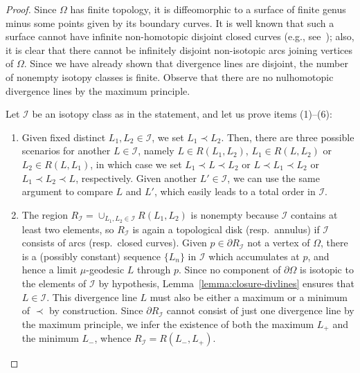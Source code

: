 \documentclass[a4paper,10pt,reqno]{amsart}
\theoremstyle{definition}
\theoremstyle{remark}
\numberwithin{equation}{section}
\begin{document}
\begin{proof}
Since $\Omega$ has finite topology, it is diffeomorphic to a surface of finite genus minus some points given by its boundary curves. It is well known that such a surface cannot have infinite non-homotopic disjoint closed curves (e.g., see~\cite[Prop.~2.3.3]{Arettines}); also, it is clear that there cannot be infinitely disjoint non-isotopic arcs joining vertices of $\Omega$. Since we have already shown that divergence lines are disjoint, the number of nonempty isotopy classes is finite. Observe that there are no nulhomotopic divergence lines by the maximum principle. 

Let $\mathcal I$ be an isotopy class as in the statement, and let us prove items (1)--(6):
\begin{enumerate}[label=(\arabic*)]
	\item Given fixed distinct $L_1,L_2\in\mathcal I$, we set $L_1\prec L_2$. Then, there are three possible scenarios for another $L\in\mathcal I$, namely $L\in R(L_1,L_2)$, $L_1\in R(L,L_2)$ or $L_2\in R(L,L_1)$, in which case we set $L_1\prec L\prec L_2$ or $L\prec L_1\prec L_2$ or $L_1\prec L_2\prec L$, respectively. Given another $L'\in\mathcal I$, we can use the same argument to compare $L$ and $L'$, which easily leads to a total order in $\mathcal I$.
	\item The region $R_{\mathcal I}=\cup_{L_1,L_2\in\mathcal I}R(L_1,L_2)$ is nonempty because $\mathcal I$ contains at least two elements, so $R_{\mathcal I}$ is again a topological disk (resp.\ annulus) if $\mathcal I$ consists of arcs (resp.\ closed curves). Given $p\in\partial R_{\mathcal I}$ not a vertex of $\Omega$, there is a (possibly constant) sequence $\{L_n\}$ in $\mathcal I$ which accumulates at $p$, and hence a limit $\mu$-geodesic $L$ through $p$. Since no component of $\partial\Omega$ is isotopic to the elements of $\mathcal I$ by hypothesis, Lemma~\ref{lemma:closure-divlines} ensures that $L\in\mathcal I$. This divergence line $L$ must also be either a maximum or a minimum of $\prec$ by construction. Since $\partial R_{\mathcal I}$ cannot consist of just one divergence line by the maximum principle, we infer the existence of both the maximum $L_+$ and the minimum $L_-$, whence $R_{\mathcal I}=R(L_-,L_+)$. 


\end{enumerate}
\end{proof}
\end{document}
